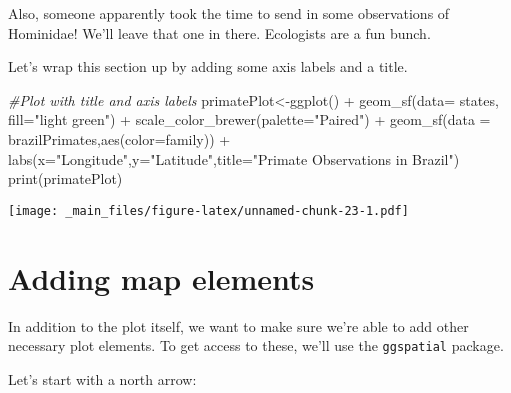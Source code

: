 \documentclass[
]{book}
\newenvironment{Shaded}{\begin{snugshade}}{\end{snugshade}}
\newcommand{\AttributeTok}[1]{\textcolor[rgb]{0.77,0.63,0.00}{#1}}
\newcommand{\CommentTok}[1]{\textcolor[rgb]{0.56,0.35,0.01}{\textit{#1}}}
\newcommand{\FunctionTok}[1]{\textcolor[rgb]{0.00,0.00,0.00}{#1}}
\newcommand{\NormalTok}[1]{#1}
\newcommand{\OtherTok}[1]{\textcolor[rgb]{0.56,0.35,0.01}{#1}}
\newcommand{\SpecialCharTok}[1]{\textcolor[rgb]{0.00,0.00,0.00}{#1}}
\newcommand{\StringTok}[1]{\textcolor[rgb]{0.31,0.60,0.02}{#1}}
\begin{document}
Also, someone apparently took the time to send in some observations of Hominidae! We'll leave that one in there. Ecologists are a fun bunch.

Let's wrap this section up by adding some axis labels and a title.

\begin{Shaded}
\begin{Highlighting}[]
\CommentTok{\#Plot with title and axis labels}
\NormalTok{primatePlot}\OtherTok{\textless{}{-}}\FunctionTok{ggplot}\NormalTok{() }\SpecialCharTok{+} 
  \FunctionTok{geom\_sf}\NormalTok{(}\AttributeTok{data=}\NormalTok{ states, }\AttributeTok{fill=}\StringTok{"light green"}\NormalTok{) }\SpecialCharTok{+}
  \FunctionTok{scale\_color\_brewer}\NormalTok{(}\AttributeTok{palette=}\StringTok{"Paired"}\NormalTok{) }\SpecialCharTok{+}
  \FunctionTok{geom\_sf}\NormalTok{(}\AttributeTok{data =}\NormalTok{ brazilPrimates,}\FunctionTok{aes}\NormalTok{(}\AttributeTok{color=}\NormalTok{family)) }\SpecialCharTok{+}
  \FunctionTok{labs}\NormalTok{(}\AttributeTok{x=}\StringTok{"Longitude"}\NormalTok{,}\AttributeTok{y=}\StringTok{"Latitude"}\NormalTok{,}\AttributeTok{title=}\StringTok{"Primate Observations in Brazil"}\NormalTok{)}
\FunctionTok{print}\NormalTok{(primatePlot)}
\end{Highlighting}
\end{Shaded}

\texttt{[image: \_main\_files/figure-latex/unnamed-chunk-23-1.pdf]}

\hypertarget{adding-map-elements}{%
\chapter{Adding map elements}\label{adding-map-elements}}

In addition to the plot itself, we want to make sure we're able to add other necessary plot elements. To get access to these, we'll use the \texttt{ggspatial} package.

Let's start with a north arrow:
\end{document}
